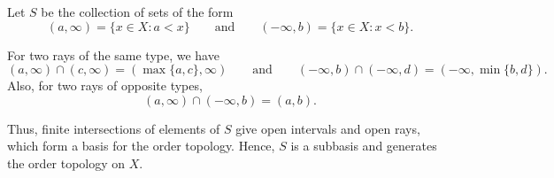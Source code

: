
Let $S$ be the collection of sets of the form
\[
  (a,\infty)=\{x\in X:a<x\}
  \qquad\text{and}\qquad
  (-\infty,b)=\{x\in X:x<b\}.
\]

For two rays of the same type, we have
\[
  (a,\infty)\cap(c,\infty)=(\max\{a,c\},\infty)
  \qquad\text{and}\qquad
  (-\infty,b)\cap(-\infty,d)=(-\infty,\min\{b,d\}).
\]
Also, for two rays of opposite types,
\[
  (a,\infty)\cap(-\infty,b)=(a,b).
\]

Thus, finite intersections of elements of $S$ give open intervals and open rays, which form a
basis for the order topology. Hence, $S$ is a subbasis and generates the order topology on $X$.
